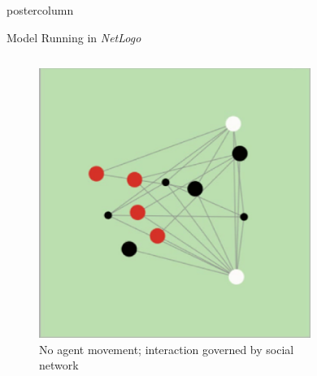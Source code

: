 \documentclass[final,hyperref={pdfpagelabels=false}]{beamer}
\begin{document}
\begin{frame}
\begin{columns}[T]
\begin{column}{.33\textwidth}
\begin{beamercolorbox}[center,wd=\textwidth]{postercolumn}
\begin{minipage}[T]{.95\textwidth}
{\begin{block}{Model Running in \textit{NetLogo}}
                \centering
                \begin{columns}[T]
                  \begin{column}{.32\textwidth}
                    \begin{figure}[h!]
                    \includegraphics[width=\linewidth]{images/networks}
                    \caption{No agent movement; interaction governed by social network}
                    \end{figure}
                  \end{column}         
                  \begin{column}{.32\textwidth}               
                   	\begin{figure}[h!]

\end{figure}
\end{column}
\end{columns}
\end{block}}
\end{minipage}
\end{beamercolorbox}
\end{column}
\end{columns}
\end{frame}
\end{document}
